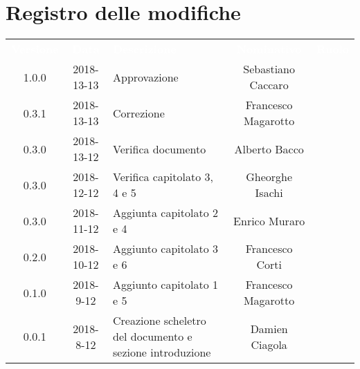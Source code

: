 
\section*{Registro delle modifiche}
{
	\renewcommand{\arraystretch}{1.5}
	\centering
	\begin{longtable}{ c c  C{4cm}  c  c }
		\textcolor{white}{\textbf{Versione}} & \textcolor{white}{\textbf{Data}} & \textcolor{white}{\textbf{Descrizione}} & \textcolor{white}{\textbf{Nominativo}} & \textcolor{white}{\textbf{Ruolo}}\\
		1.0.0 & 2018-13-13 & Approvazione & Sebastiano Caccaro & \Res{} \\		
		0.3.1 & 2018-13-13 & Correzione & Francesco Magarotto & \reda{} \\
		0.3.0 & 2018-13-12 & Verifica documento & Alberto Bacco & \ver{} \\
		0.3.0 & 2018-12-12 & Verifica capitolato 3, 4 e 5 & Gheorghe Isachi & \ver{}\\
		0.3.0 & 2018-11-12 & Aggiunta capitolato 2 e 4 & Enrico Muraro & \reda{}\\
		0.2.0 & 2018-10-12 & Aggiunto capitolato 3 e 6 & Francesco Corti & \reda{}\\
		0.1.0 & 2018-9-12 & Aggiunto capitolato 1 e 5 & Francesco Magarotto & \reda{} \\
		0.0.1 & 2018-8-12 & Creazione scheletro del documento e sezione introduzione & Damien Ciagola & \reda{}\\
	\end{longtable}

}